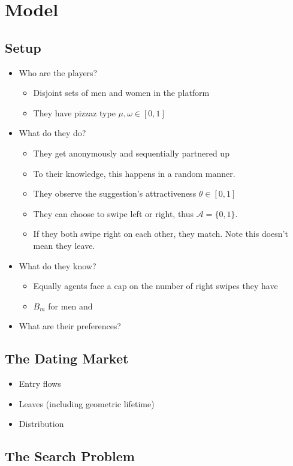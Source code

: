 \section{Model}
\label{sec: figs tables algos}
\subsection{Setup} 
\begin{itemize}
    \item Who are the players?
    \begin{itemize}
        \item Disjoint sets of men and women in the platform
        \item They have pizzaz type $\mu,\omega \in [0,1]$
    \end{itemize} 
    \item What do they do?
    \begin{itemize}
        \item They get anonymously and sequentially partnered up
        \item To their knowledge, this happens in a random manner.
        \item They observe the suggestion's attractiveness $\theta\in [0,1]$
        \item They can choose to swipe left or right, thus $\mathcal{A}=\{0,1\}$.
        \item If they both swipe right on each other, they match. Note this doesn't mean they leave.
    \end{itemize}
    \item What do they know?
    \begin{itemize}
        
        \item Equally agents face a cap on the number of right swipes they have
        \item $B_m$ for men and 
    \end{itemize}
    \item What are their preferences?
\end{itemize}
\subsection{The Dating Market}
\begin{itemize}
    \item Entry flows
    \item Leaves (including geometric lifetime)
    \item Distribution
\end{itemize}
\subsection{The Search Problem} 